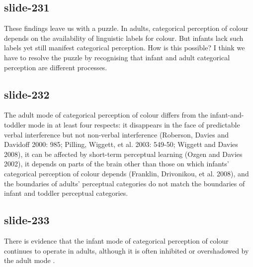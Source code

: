 \documentclass[12pt,\papersize]{extarticle}
\begin{document}
 
\subsection{slide-231}
These findings leave us with a puzzle.
In adults, categorical perception of colour depends on the availability of linguistic labels for colour.
But infants lack such labels yet still manifest categorical perception.
How is this possible?
I think we have to resolve the puzzle by recognising that infant and adult categorical perception are different processes.
 
 
\subsection{slide-232}
The adult mode of categorical perception of colour differs from the infant-and-toddler mode in at least four respects: it disappears in the face of predictable verbal interference but not non-verbal interference (Roberson, Davies and Davidoff 2000: 985; Pilling, Wiggett, et al. 2003: 549-50; Wiggett and Davies 2008), it can be affected by short-term perceptual learning (Ozgen and Davies 2002), it depends on parts of the brain other than those on which infants' categorical perception of colour depends (Franklin, Drivonikou, et al. 2008), and the boundaries of adults' perceptual categories do not match the boundaries of infant and toddler perceptual categories.
 
 
\subsection{slide-233}
There is evidence that the infant mode of categorical perception of colour continues to operate in adults, although it is often inhibited or overshadowed by the adult mode \citep{Gilbert:2006yb}.
 
 
\end{document}
